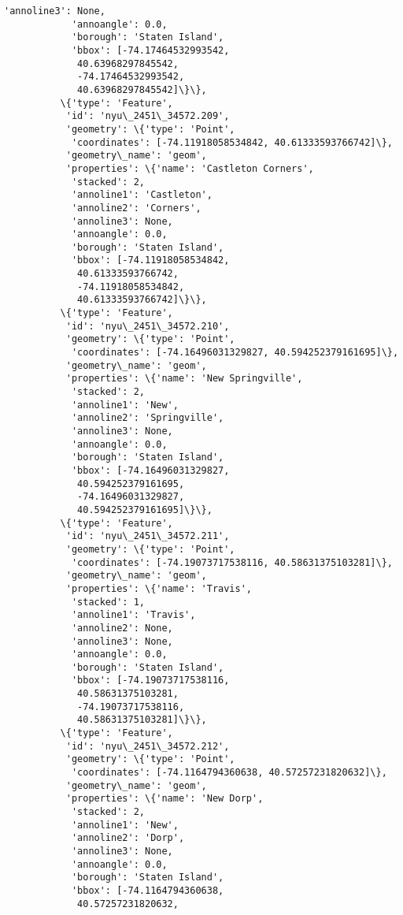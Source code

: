 \documentclass[11pt]{article}
\begin{document}
\begin{Verbatim}[commandchars=\\\{\}]
            'annoline3': None,
            'annoangle': 0.0,
            'borough': 'Staten Island',
            'bbox': [-74.17464532993542,
             40.63968297845542,
             -74.17464532993542,
             40.63968297845542]\}\},
          \{'type': 'Feature',
           'id': 'nyu\_2451\_34572.209',
           'geometry': \{'type': 'Point',
            'coordinates': [-74.11918058534842, 40.61333593766742]\},
           'geometry\_name': 'geom',
           'properties': \{'name': 'Castleton Corners',
            'stacked': 2,
            'annoline1': 'Castleton',
            'annoline2': 'Corners',
            'annoline3': None,
            'annoangle': 0.0,
            'borough': 'Staten Island',
            'bbox': [-74.11918058534842,
             40.61333593766742,
             -74.11918058534842,
             40.61333593766742]\}\},
          \{'type': 'Feature',
           'id': 'nyu\_2451\_34572.210',
           'geometry': \{'type': 'Point',
            'coordinates': [-74.16496031329827, 40.594252379161695]\},
           'geometry\_name': 'geom',
           'properties': \{'name': 'New Springville',
            'stacked': 2,
            'annoline1': 'New',
            'annoline2': 'Springville',
            'annoline3': None,
            'annoangle': 0.0,
            'borough': 'Staten Island',
            'bbox': [-74.16496031329827,
             40.594252379161695,
             -74.16496031329827,
             40.594252379161695]\}\},
          \{'type': 'Feature',
           'id': 'nyu\_2451\_34572.211',
           'geometry': \{'type': 'Point',
            'coordinates': [-74.19073717538116, 40.58631375103281]\},
           'geometry\_name': 'geom',
           'properties': \{'name': 'Travis',
            'stacked': 1,
            'annoline1': 'Travis',
            'annoline2': None,
            'annoline3': None,
            'annoangle': 0.0,
            'borough': 'Staten Island',
            'bbox': [-74.19073717538116,
             40.58631375103281,
             -74.19073717538116,
             40.58631375103281]\}\},
          \{'type': 'Feature',
           'id': 'nyu\_2451\_34572.212',
           'geometry': \{'type': 'Point',
            'coordinates': [-74.1164794360638, 40.57257231820632]\},
           'geometry\_name': 'geom',
           'properties': \{'name': 'New Dorp',
            'stacked': 2,
            'annoline1': 'New',
            'annoline2': 'Dorp',
            'annoline3': None,
            'annoangle': 0.0,
            'borough': 'Staten Island',
            'bbox': [-74.1164794360638,
             40.57257231820632,

\end{Verbatim}
\end{document}
